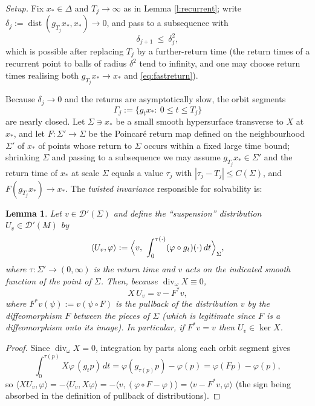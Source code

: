 \documentclass[11pt]{amsart}
\theoremstyle{plain}
\newtheorem{lemma}[theorem]{Lemma}
\theoremstyle{definition}
\theoremstyle{remark}
\newcommand{\DD}{\mathcal{D}'}
\begin{document}
\emph{Setup.}  Fix $x_* \in\Delta$ and $T_j\to\infty$ as in Lemma
\ref{l:recurrent}; write $\delta_j:=
\operatorname{dist}(g_{T_j}x_*,x_*)\to0$, and pass to a subsequence
with
\begin{equation}\label{eq:fastreturn}
\delta_{j+1}\ \le\ \delta_j^2 ,
\end{equation}
which is possible after replacing $T_j$ by a further-return time
(the return times of a recurrent point to balls of radius
$\delta^2$ tend to infinity, and one may choose return times
realising both $g_{T_j}x_*\to x_*$ and \eqref{eq:fastreturn}).

Because $\delta_j\to0$ and the returns are asymptotically slow, the
orbit segments
\[
\Gamma_j:=\{g_t x_*:\ 0\le t\le T_j\}
\]
are nearly closed.  Let $\Sigma\ni x_*$ be a small smooth
hypersurface transverse to $X$ at $x_*$, and let
$F:\Sigma'\to\Sigma$ be the Poincaré return map defined on the
neighbourhood $\Sigma'$ of $x_*$ of points whose return to $\Sigma$
occurs within a fixed large time bound; shrinking $\Sigma$ and
passing to a subsequence we may assume $g_{T_j}x_*\in\Sigma'$ and
the return time of $x_*$ at scale $\Sigma$ equals a value
$\tau_j$ with $|\tau_j-T_j|\le C(\Sigma)$, and
$F(g_{T_j}x_*)\to x_*$.  The \emph{twisted invariance} responsible
for solvability is:

\begin{lemma}\label{l:transverse}
Let $v\in\DD(\Sigma)$ and define the ``suspension'' distribution
$U_v\in\DD(M)$ by
\[
\langle U_v,\varphi\rangle
:=\Bigl\langle v,\ \int_0^{\tau(\cdot)}(\varphi\circ g_t)(\cdot)\,dt
\Bigr\rangle_{\Sigma},
\]
where $\tau:\Sigma'\to(0,\infty)$ is the return time and $v$ acts on
the indicated smooth function of the point of $\Sigma$.  Then,
because $\operatorname{div}_\omega X\equiv0$,
\[
X\,U_v=v-F^*v ,
\]
where $F^*v(\psi):=v(\psi\circ F)$ is the pullback of the
distribution $v$ by the diffeomorphism $F$ between the pieces of
$\Sigma$ (which is legitimate since $F$ is a diffeomorphism onto its
image).  In particular, if $F^*v=v$ then $U_v\in\ker X$.
\end{lemma}

\begin{proof}
Since $\operatorname{div}_\omega X=0$, integration by parts along
each orbit segment gives
\[
\int_0^{\tau(p)} X\varphi\,(g_tp)\,dt
=\varphi(g_{\tau(p)}p)-\varphi(p)=\varphi(Fp)-\varphi(p),
\]
so
$\langle XU_v,\varphi\rangle=-\langle U_v,X\varphi\rangle
=-\langle v,(\varphi\circ F-\varphi)\rangle
=\langle v-F^*v,\varphi\rangle$ (the sign being absorbed in the
definition of pullback of distributions).
\end{proof}
\end{document}

